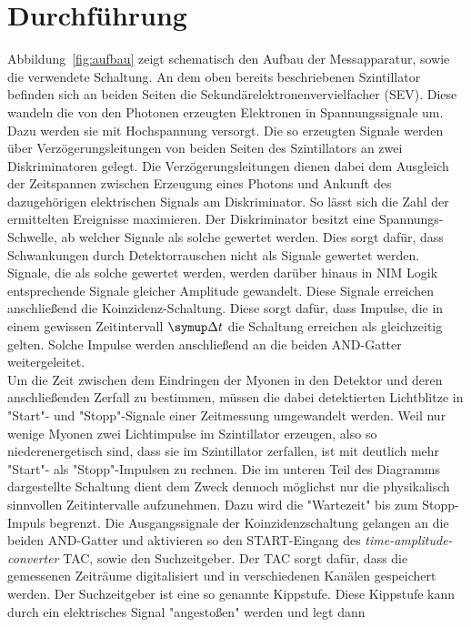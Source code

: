 \section{Durchführung}
\label{sec:durchführung}

Abbildung~\ref{fig:aufbau} zeigt schematisch den Aufbau der Messapparatur, sowie
die verwendete Schaltung. An dem oben bereits beschriebenen Szintillator
befinden sich an beiden Seiten die Sekundärelektronenvervielfacher (SEV). Diese
wandeln die von den Photonen erzeugten Elektronen in Spannungssignale um. Dazu
werden sie mit Hochspannung versorgt. Die so erzeugten Signale werden über
Verzögerungsleitungen von beiden Seiten des Szintillators an zwei
Diskriminatoren gelegt. Die Verzögerungsleitungen dienen dabei dem Ausgleich der
Zeitspannen zwischen Erzeugung eines Photons und Ankunft des dazugehörigen
elektrischen Signals am Diskriminator. So lässt sich die Zahl der ermittelten
Ereignisse maximieren. Der Diskriminator besitzt eine Spannungs-Schwelle, ab
welcher Signale als solche gewertet werden. Dies sorgt dafür, dass Schwankungen
durch Detektorrauschen nicht als Signale gewertet werden. Signale, die als
solche gewertet werden, werden darüber hinaus in NIM Logik entsprechende Signale
gleicher Amplitude gewandelt. Diese Signale erreichen anschließend die
Koinzidenz-Schaltung. Diese sorgt dafür, dass Impulse, die in einem gewissen
Zeitintervall $\upD t$ die Schaltung erreichen als gleichzeitig gelten. Solche
Impulse werden anschließend an die beiden AND-Gatter weitergeleitet. \\ Um die
Zeit zwischen dem Eindringen der Myonen in den Detektor und deren anschließenden
Zerfall zu bestimmen, müssen die dabei detektierten Lichtblitze in "Start"- und
"Stopp"-Signale einer Zeitmessung umgewandelt werden. Weil nur wenige Myonen
zwei Lichtimpulse im Szintillator erzeugen, also so niederenergetisch sind, dass
sie im Szintillator zerfallen, ist mit deutlich mehr "Start"- als
"Stopp"-Impulsen zu rechnen. Die im unteren Teil des Diagramms dargestellte
Schaltung dient dem Zweck dennoch möglichst nur die physikalisch sinnvollen
Zeitintervalle aufzunehmen. Dazu wird die "Wartezeit" bis zum Stopp-Impuls
begrenzt. Die Ausgangssignale der Koinzidenzschaltung gelangen an die beiden
AND-Gatter und aktivieren so den START-Eingang des
\textit{time-amplitude-converter} TAC, sowie den Suchzeitgeber. Der TAC sorgt
dafür, dass die gemessenen Zeiträume digitalisiert und in verschiedenen Kanälen
gespeichert werden. Der Suchzeitgeber ist eine so genannte Kippstufe. Diese
Kippstufe kann durch ein elektrisches Signal "angestoßen" werden und legt dann
